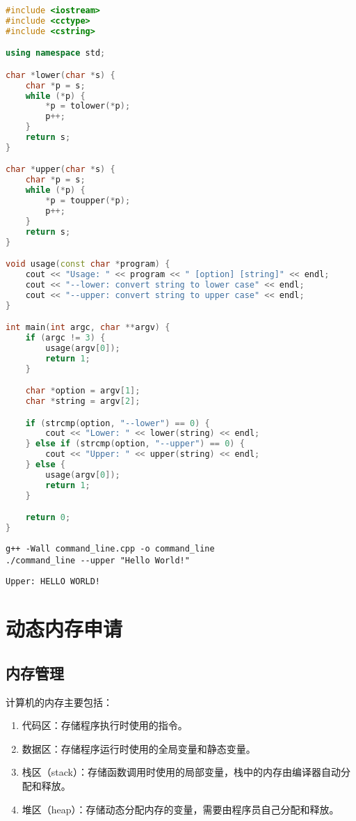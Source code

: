 \begin{lstlisting}[language=C++]
#include <iostream>
#include <cctype>
#include <cstring>

using namespace std;

char *lower(char *s) {
    char *p = s;
    while (*p) {
        *p = tolower(*p);
        p++;
    }
    return s;
}

char *upper(char *s) {
    char *p = s;
    while (*p) {
        *p = toupper(*p);
        p++;
    }
    return s;
}

void usage(const char *program) {
    cout << "Usage: " << program << " [option] [string]" << endl;
    cout << "--lower: convert string to lower case" << endl;
    cout << "--upper: convert string to upper case" << endl;
}

int main(int argc, char **argv) {
    if (argc != 3) {
        usage(argv[0]);
        return 1;
    }

    char *option = argv[1];
    char *string = argv[2];

    if (strcmp(option, "--lower") == 0) {
        cout << "Lower: " << lower(string) << endl;
    } else if (strcmp(option, "--upper") == 0) {
        cout << "Upper: " << upper(string) << endl;
    } else {
        usage(argv[0]);
        return 1;
    }

    return 0;
}
\end{lstlisting}

\begin{lstlisting}
g++ -Wall command_line.cpp -o command_line
./command_line --upper "Hello World!"
\end{lstlisting}

\begin{tcolorbox}
    \begin{verbatim}
Upper: HELLO WORLD!
	\end{verbatim}
\end{tcolorbox}

\newpage

\section{动态内存申请}

\subsection{内存管理}

计算机的内存主要包括：

\begin{enumerate}
    \item 代码区：存储程序执行时使用的指令。
    \item 数据区：存储程序运行时使用的全局变量和静态变量。
    \item 栈区（stack）：存储函数调用时使用的局部变量，栈中的内存由编译器自动分配和释放。
    \item 堆区（heap）：存储动态分配内存的变量，需要由程序员自己分配和释放。
\end{enumerate}

